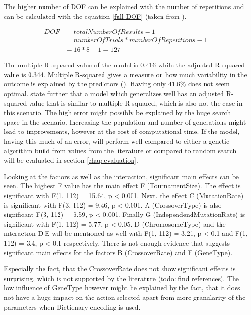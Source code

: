 The higher number of DOF can be explained with the number of repetitions and can be calculated with the equation \ref{full DOF} (taken from \cite{roy_primer_1990}).

\begin{equation} \label{full DOF}
	\begin{split}
		DOF & = totalNumberOfResults - 1 \\
		& = numberOfTrials * numberOfRepetitions - 1 \\
		& = 16 * 8 - 1 = 127
	\end{split}
\end{equation}

The multiple R-squared value of the model is 0.416 while the adjusted R-squared value is 0.344. Multiple R-squared gives a measure on how much variability in the outcome is explained by the predictors (\cite{field_discovering_2012}). Having only 41.6\% does not seem optimal. \cite{field_discovering_2012} state further that a model which generalizes well has an adjusted R-squared value that is similar to multiple R-squared, which is also not the case in this scenario.
The high error might possibly be explained by the huge search space in the scenario. Increasing the population and number of generations might lead to improvements, however at the cost of computational time. If the model, having this much of an error, will perform well compared to either a genetic algorithm build from values from the literature or compared to random search will be evaluated in section \ref{chap:evaluation}.

Looking at the factors as well as the interaction, significant main effects can be seen. The highest F value has the main effect F (TournamentSize). The effect is significant with F(1, 112) = 15.64, p < 0.001. Next, the effect C (MutationRate) is significant with F(3, 112) = 9.46, p < 0.001. A (CrossoverType) is also significant F(3, 112) = 6.59, p < 0.001. Finally G (IndependendMutationRate) is significant with F(1, 112) = 5.77, p < 0.05.
D (ChromosomeType) and the interaction D:E will be mentioned as well with F(1, 112) = 3.21, p < 0.1 and F(1, 112) = 3.4, p < 0.1 respectively.
There is not enough evidence that suggests significant main effects for the factors B (CrossoverRate) and E (GeneType).

Especially the fact, that the CrossoverRate does not show significant effects is surprising, which is not supported by the literature (todo: find references). The low influence of GeneType however might be explained by the fact, that it does not have a huge impact on the action selected apart from more granularity of the parameters when Dictionary encoding is used.

